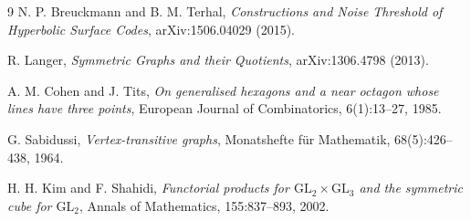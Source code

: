 \documentclass[11pt,a4paper]{article}
\theoremstyle{plain}
\theoremstyle{definition}
\begin{document}
\begin{thebibliography}{9}
N. P. Breuckmann and B. M. Terhal,
\emph{Constructions and Noise Threshold of Hyperbolic Surface Codes},
arXiv:1506.04029 (2015).

R. Langer,
\emph{Symmetric Graphs and their Quotients},
arXiv:1306.4798 (2013).

A. M. Cohen and J. Tits,
\emph{On generalised hexagons and a near octagon whose lines have three points},
European Journal of Combinatorics, 6(1):13--27, 1985.

G. Sabidussi,
\emph{Vertex-transitive graphs},
Monatshefte f\"ur Mathematik, 68(5):426--438, 1964.

H. H. Kim and F. Shahidi,
\emph{Functorial products for $\mathrm{GL}_2 \times \mathrm{GL}_3$ and the
symmetric cube for $\mathrm{GL}_2$},
Annals of Mathematics, 155:837--893, 2002.
\end{thebibliography}
\end{document}
